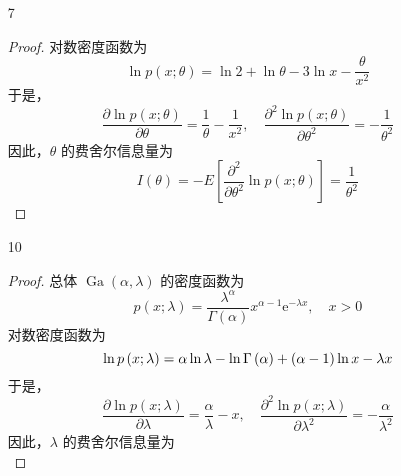 \documentclass[normal,founder,mtpro2,cn]{elegantnote}
\begin{document}
\begin{enumerate}
\begin{proof}
\begin{enumerate}
                      所以，$\hat{g}\left(\theta\right)=-\frac{1}{n}\sum_{i=1}^{n}\ln x_{i}$ 是 $g\left(\theta\right)$ 的有效估计。
            \end{enumerate}
        \end{proof}
    \item[7]
        \begin{proof}
            对数密度函数为
            \begin{equation*}
                \ln p\left(x;\theta\right)=\ln 2+\ln\theta-3\ln x-\frac{\theta}{x^{2}}
            \end{equation*}
            于是，
            \begin{equation*}
                \frac{\partial\ln p\left(x;\theta\right)}{\partial\theta}=\frac{1}{\theta}-\frac{1}{x^{2}},\quad\frac{\partial^{2}\ln p\left(x;\theta\right)}{\partial\theta^{2}}=-\frac{1}{\theta^{2}}
            \end{equation*}
            因此，$\theta$ 的费舍尔信息量为
            \begin{equation*}
                I\left(\theta\right)=-E\left[\frac{\partial^{2}}{\partial\theta^{2}}\ln p\left(x;\theta\right)\right]=\frac{1}{\theta^{2}}
            \end{equation*}
        \end{proof}
    \item[10]
        \begin{proof}
            总体 $\operatorname{Ga}\left(\alpha,\lambda\right)$ 的密度函数为
            \begin{equation*}
                p\left(x;\lambda\right)=\frac{\lambda^{\alpha}}{\Gamma(\alpha)}x^{\alpha-1}\mathrm{e}^{-\lambda x},\quad x>0
            \end{equation*}
            对数密度函数为
            \begin{equation*}
                \ln p\left(x;\lambda\right)=\alpha\ln\lambda-\ln \Gamma\left(\alpha\right)+\left(\alpha-1\right)\ln x-\lambda x \\
            \end{equation*}
            于是，
            \begin{equation*}
                \frac{\partial\ln p\left(x;\lambda\right)}{\partial\lambda}=\frac{\alpha}{\lambda}-x,\quad\frac{\partial^{2}\ln p\left(x;\lambda\right)}{\partial\lambda^{2}}=-\frac{\alpha}{\lambda^{2}}
            \end{equation*}
            因此，$\lambda$ 的费舍尔信息量为
            \begin{equation*}

\end{equation*}
\end{proof}
\end{enumerate}
\end{document}
